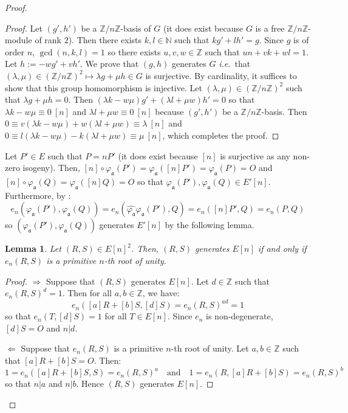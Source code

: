 \documentclass[a4paper,10pt]{report}
\theoremstyle{definition}
\theoremstyle{plain}
\newtheorem{lemma}[definition]{Lemma}
\theoremstyle{definition}
\newcommand{\ie}{\emph{i.e.}\ }
\newcommand{\N}{\mathbb{N}}
\newcommand{\Z}{\mathbb{Z}}
\renewcommand{\(}{\left(}
\renewcommand{\)}{\right)}
\newcommand{\mf}[1]{\mathfrak{#1}}
\begin{document}
\begin{proof}
\begin{proof}
Let $(g',h')$ be a $\Z/n\Z$-basis of $G$ (it does exist because $G$ is a free $\Z/n\Z$-module of rank $2$). Then there exists $k,l\in\N$ such that $kg'+lh'=g$. Since $g$ is of order $n$, $\gcd(n,k,l)=1$ so there exists $u,v,w\in\Z$ such that $un+vk+wl=1$. Let $h:=-wg'+vh'$. We prove that $(g,h)$ generates $G$ \ie that $(\lambda,\mu)\in(\Z/n\Z)^2\longmapsto \lambda g+\mu h\in G$ is surjective. By cardinality, it suffices to show that this group homomorphism is injective. Let $(\lambda,\mu)\in(\Z/n\Z)^2$ such that $\lambda g+\mu h=0$. Then $(\lambda k-w\mu)g'+(\lambda l+\mu w)h'=0$ so that $\lambda k-w\mu\equiv 0 \ [n]$ and $\lambda l+\mu w\equiv 0 \ [n]$ because $(g',h')$ be a $\Z/n\Z$-basis.  Then $0\equiv v(\lambda k-w\mu)+w(\lambda l+\mu w)\equiv \lambda \ [n]$ and $0\equiv l(\lambda k-w\mu)-k(\lambda l+\mu w)\equiv \mu \ [n]$, which completes the proof.
\end{proof}

Let $P'\in E$ such that $P=nP'$ (it does exist because $[n]$ is surjective as any non-zero isogeny). Then, $[n]\circ\varphi_{\mf{a}}(P')=\varphi_{\mf{a}}([n]P')=\varphi_{\mf{a}}(P)=O$ and $[n]\circ\varphi_{\mf{a}}(Q)=\varphi_{\mf{a}}([n]Q)=O$ so that $\varphi_{\mf{a}}(P'),\varphi_{\mf{a}}(Q)\in E'[n]$. Furthermore, by \cite[proposition III.8.2]{Silverman1}:
\[e_n(\varphi_{\mf{a}}(P'),\varphi_{\mf{a}}(Q))=e_n(\widehat{\varphi_{\mf{a}}}\varphi_{\mf{a}}(P'),Q)=e_n([n]P',Q)=e_n(P,Q)\]
so $(\varphi_{\mf{a}}(P'),\varphi_{\mf{a}}(Q))$ generates $E'[n]$ by the following lemma.

\begin{lemma}
Let $(R,S)\in E[n]^2$. Then, $(R,S)$ generates $E[n]$ if and only if $e_n(R,S)$ is a primitive $n$-th root of unity.
\end{lemma}

\begin{proof}
$\Longrightarrow$ Suppose that $(R,S)$ generates $E[n]$. Let $d\in\Z$ such that $e_n(R,S)^d=1$. Then for all $a, b\in \Z$, we have:
\[e_n([a]R+[b]S,[d]S)=e_n(R,S)^{ad}=1\]
so that $e_n(T,[d]S)=1$ for all $T\in E[n]$. Since $e_n$ is non-degenerate, $[d]S=O$ and $n|d$. 

$\Longleftarrow$ Suppose that $e_n(R,S)$ is a primitive $n$-th root of unity. Let $a, b\in \Z$ such that $[a]R+[b]S=O$. Then:
\[1=e_n([a]R+[b]S,S)=e_n(R,S)^a \quad \mbox{and} \quad 1=e_n(R,[a]R+[b]S)=e_n(R,S)^b\]
so that $n|a$ and $n|b$. Hence $(R,S)$ generates $E[n]$.
\end{proof}


\end{proof}
\end{document}
